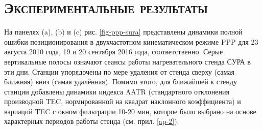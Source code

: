 \section{\textsc{Экспериментальные результаты}}

На панелях (a), (b) и (c) рис. \ref{fig-ppp-sura} представлены динамики полной ошибки позиционирования в двухчастотном кинематическом режиме PPP для 23 августа 2010 года, 19 и 20 сентября 2016 года, соответственно.
Серые вертикальные полосы означают сеансы работы нагревательного стенда СУРА в эти дни.
Станции упорядочены по мере удаления от стенда сверху (самая ближняя) вниз (самая удалённая). 
Помимо этого, для ближайшей к стенду станции добавлены динамики индекса AATR \cite{Juan2018} (стандартного отклонения производной TEC, нормированной на квадрат наклонного коэффициента) и вариаций TEC с окном фильтрации 10-20 мин, которое было выбрано на основе характерных периодов работы стенда (см. прил. \ref{ap-2}).

